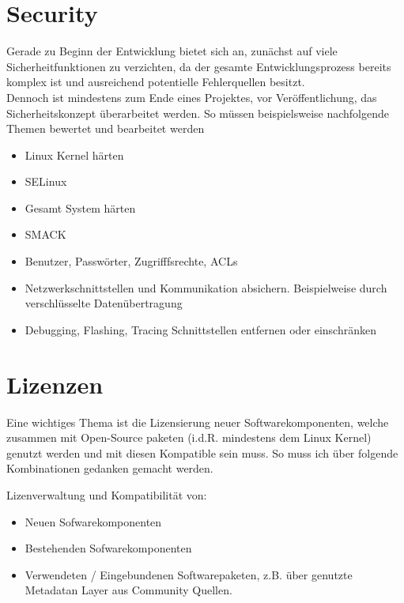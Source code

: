 \section{Security}%
Gerade zu Beginn der Entwicklung bietet sich an, zunächst auf viele
Sicherheit\-funktionen zu verzichten, da der gesamte Entwicklungs\-prozess
bereits komplex ist und ausreichend potentielle Fehlerquellen besitzt.
\\

Dennoch ist mindestens zum Ende eines Projektes, vor Veröffentlichung, das
Sicherheits\-konzept überarbeitet werden.
So müssen beispielsweise nachfolgende Themen bewertet und bearbeitet werden
\label{sec:security}

\begin{itemize}
    \item Linux Kernel härten
    \item SELinux
    \item Gesamt System härten
    \item SMACK
    \item Benutzer, Passwörter, Zugrifffsrechte, ACLs
    \item Netzwerkschnittstellen und Kommunikation absichern. Beispielweise
        durch verschlüsselte Datenübertragung
    \item Debugging, Flashing, Tracing Schnittstellen entfernen oder
        einschränken
\end{itemize}


\section{Lizenzen}%
\label{sec:lizenzen}

Eine wichtiges Thema ist die Lizensierung neuer Softwarekomponenten, welche
zusammen mit Open-Source paketen (i.d.R. mindestens dem Linux Kernel) genutzt
werden und mit diesen Kompatible sein muss. So muss ich über folgende
Kombinationen gedanken gemacht werden.

Lizenverwaltung und Kompatibilität von:
\begin{itemize}
    \item Neuen Sofwarekomponenten
    \item Bestehenden  Sofwarekomponenten
    \item Verwendeten / Eingebundenen Softwarepaketen, z.B. über genutzte
        Metadatan Layer aus Community Quellen.
\end{itemize}


